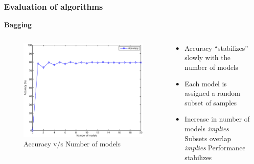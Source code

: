 \documentclass{beamer}
\begin{document}
    \begin{frame}
        \frametitle{Evaluation of algorithms}
        \begin{center}
            \textbf{Bagging}
        \end{center}
        \begin{columns}
            \begin{column}{0.5\textwidth}
                \begin{figure}
                    \centering
                    \includegraphics[width=\textwidth]{figures/bagging_n_models.eps}
                    \caption{Accuracy v/s Number of models}
                \end{figure}
            \end{column}
            \begin{column}{0.5\textwidth}
                \begin{itemize}
                    \item{Accuracy ``stabilizes'' slowly with the number of models}
                    \item{Each model is assigned a random subset of samples}
                    \item{Increase in number of models \emph{implies} Subsets overlap \emph{implies} Performance stabilizes}
                \end{itemize}
            \end{column}
        \end{columns}
    \end{frame}
    
\end{document}
